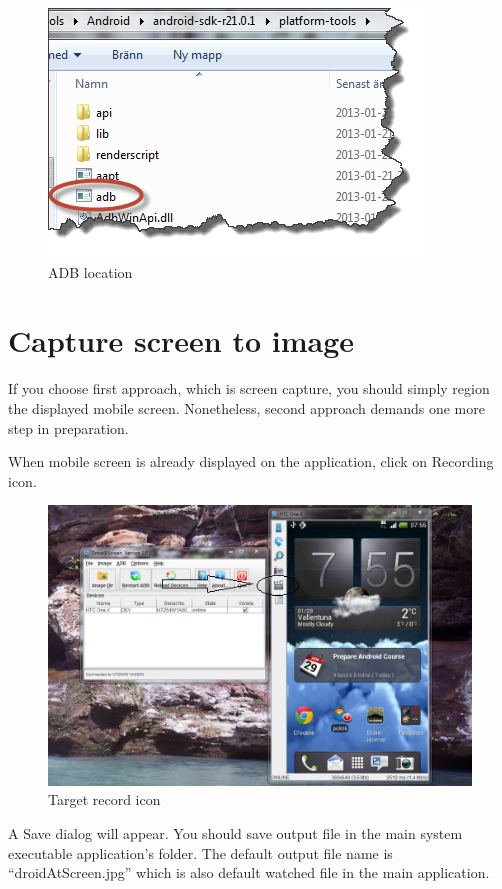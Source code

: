    \begin{figure}[H]
		\centering
		\includegraphics[scale=0.75]{Chapters/Fig/adb.png}
		\caption{ADB location}
		\label{fig:adb}
	\end{figure}
    
\section{Capture screen to image}
If you choose first approach, which is screen capture, you should simply region the displayed mobile screen. Nonetheless, second approach demands one more step in preparation.

When mobile screen is already displayed on the application, click on Recording icon.

	\begin{figure}[H]
		\centering
		\includegraphics[scale=0.75]{Chapters/Fig/record.png}
		\caption{Target record icon}
		\label{fig:record}
	\end{figure}
    
A Save dialog will appear. You should save output file in the main system executable application's folder. The default output file name is ``droidAtScreen.jpg'' which is also default watched file in the main application.